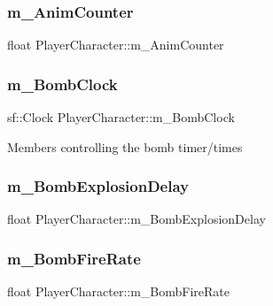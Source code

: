 \subsubsection{\texorpdfstring{m\+\_\+\+Anim\+Counter}{m\_AnimCounter}}
{\footnotesize\ttfamily float Player\+Character\+::m\+\_\+\+Anim\+Counter\hspace{0.3cm}{\ttfamily [protected]}}

\hypertarget{class_player_character_a8fa9ea765016a1b910ab7007f2071edb}{}\label{class_player_character_a8fa9ea765016a1b910ab7007f2071edb} 
\subsubsection{\texorpdfstring{m\+\_\+\+Bomb\+Clock}{m\_BombClock}}
{\footnotesize\ttfamily sf\+::\+Clock Player\+Character\+::m\+\_\+\+Bomb\+Clock\hspace{0.3cm}{\ttfamily [protected]}}

Members controlling the bomb timer/times \hypertarget{class_player_character_a1f8732b219730a15a1666ec77e690a71}{}\label{class_player_character_a1f8732b219730a15a1666ec77e690a71} 
\subsubsection{\texorpdfstring{m\+\_\+\+Bomb\+Explosion\+Delay}{m\_BombExplosionDelay}}
{\footnotesize\ttfamily float Player\+Character\+::m\+\_\+\+Bomb\+Explosion\+Delay\hspace{0.3cm}{\ttfamily [protected]}}

\hypertarget{class_player_character_ad8ccf5c2e03d93085bacaf60f2801fb7}{}\label{class_player_character_ad8ccf5c2e03d93085bacaf60f2801fb7} 
\subsubsection{\texorpdfstring{m\+\_\+\+Bomb\+Fire\+Rate}{m\_BombFireRate}}
{\footnotesize\ttfamily float Player\+Character\+::m\+\_\+\+Bomb\+Fire\+Rate\hspace{0.3cm}{\ttfamily [protected]}}

